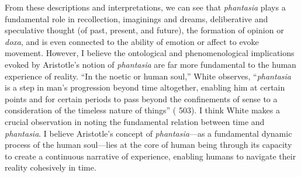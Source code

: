 \documentclass{article}
\begin{document}
From these descriptions and interpretations, we can see that \textit{phantasia} plays a fundamental role in recollection, imaginings and dreams, deliberative and speculative thought (of past, present, and future), the formation of opinion or \textit{doxa}, and is even connected to the ability of emotion or affect to evoke movement. However, I believe the ontological and phenomenological implications evoked by Aristotle's notion of \textit{phantasia} are far more fundamental to the human experience of reality. ``In the noetic or human soul,'' White observes, ``\textit{phantasia} is a step in man's progression beyond time altogether, enabling him at certain points and for certain periods to pass beyond the confinements of sense to a consideration of the timeless nature of things'' (\cite{white1985meaning} 503). I think White makes a crucial observation in noting the fundamental relation between time and \textit{phantasia}. I believe Aristotle's concept of \textit{phantasia}---as a fundamental dynamic process of the human soul---lies at the core of human being through its capacity to create a continuous narrative of experience, enabling humans to navigate their reality cohesively in time.
\end{document}
